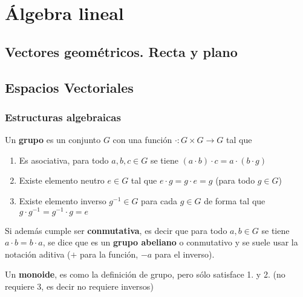 %
%
%

\part{Álgebra lineal}

\chapter{Vectores geométricos.  Recta y plano}


\chapter{Espacios Vectoriales}


\section{Estructuras algebraicas}

\begin{definition}
Un \textbf{grupo} es un conjunto $G$ con una función $\cdot : G \times G \to G$ tal que

\begin{enumerate}
\item Es asociativa, para todo $a,b,c \in G$ se tiene
$(a \cdot b) \cdot c = a \cdot (b \cdot g)$

\item Existe elemento neutro $ e \in G$ tal que
$ e \cdot g = g \cdot e = g$ (para todo $ g \in G$)

\item Existe elemento inverso $ g^{-1} \in G$ para cada $ g \in G$ de forma tal que $ g \cdot g^{-1} = g^{-1} \cdot g = e$

\end{enumerate}

Si además cumple ser \textbf{conmutativa}, es decir que para todo $ a,b \in G$ se tiene $ a \cdot b = b \cdot a$, se dice que es un \textbf{grupo abeliano} o conmutativo y se suele usar la notación aditiva ($+$ para la función, $-a$ para el inverso).

Un \textbf{monoide}, es como la definición de grupo, pero sólo satisface 1. y 2. (no requiere 3, es decir no requiere inversos)


\end{definition}


